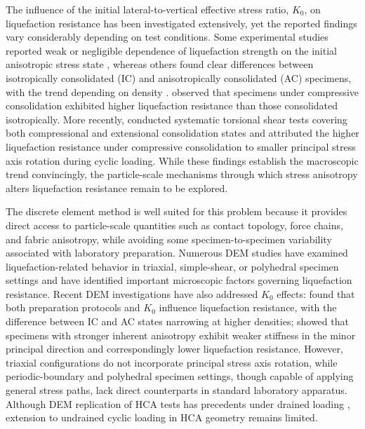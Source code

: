 \documentclass[a4paper,fleqn]{cas-sc}
\newcommand{\Kzero}{\ensuremath{K_0}}
\begin{document}
The influence of the initial lateral-to-vertical effective stress ratio, \Kzero{}, on liquefaction resistance has been investigated extensively, yet the reported findings vary considerably depending on test conditions. Some experimental studies reported weak or negligible dependence of liquefaction strength on the initial anisotropic stress state \citep[e.g.,][]{IshiharaTakatsu1979,YamashitaToki1993}, whereas others found clear differences between isotropically consolidated (IC) and anisotropically consolidated (AC) specimens, with the trend depending on density \citep{GeorgiannouKonstadinou2014}. \citet{Vargas2020} observed that specimens under compressive consolidation exhibited higher liquefaction resistance than those consolidated isotropically. More recently, \citet{Zhao2024} conducted systematic torsional shear tests covering both compressional and extensional consolidation states and attributed the higher liquefaction resistance under compressive consolidation to smaller principal stress axis rotation during cyclic loading. While these findings establish the macroscopic trend convincingly, the particle-scale mechanisms through which stress anisotropy alters liquefaction resistance remain to be explored.

The discrete element method \citep[DEM;][]{Cundall1979} is well suited for this problem because it provides direct access to particle-scale quantities such as contact topology, force chains, and fabric anisotropy, while avoiding some specimen-to-specimen variability associated with laboratory preparation. Numerous DEM studies have examined liquefaction-related behavior in triaxial, simple-shear, or polyhedral specimen settings \citep[e.g.,][]{Huang2018,Yang2021,Jiang2021,Morimoto2021,WuYang2022,Xie2023,YangHuang2023,Zhang2023} and have identified important microscopic factors governing liquefaction resistance. Recent DEM investigations have also addressed \Kzero{} effects: \citet{YangTaiebat2024} found that both preparation protocols and \Kzero{} influence liquefaction resistance, with the difference between IC and AC states narrowing at higher densities; \citet{Otsubo2022} showed that specimens with stronger inherent anisotropy exhibit weaker stiffness in the minor principal direction and correspondingly lower liquefaction resistance. However, triaxial configurations do not incorporate principal stress axis rotation, while periodic-boundary and polyhedral specimen settings, though capable of applying general stress paths, lack direct counterparts in standard laboratory apparatus. Although DEM replication of HCA tests has precedents under drained loading \citep[e.g.,][]{Li2014,Liu2021}, extension to undrained cyclic loading in HCA geometry remains limited.
\end{document}
